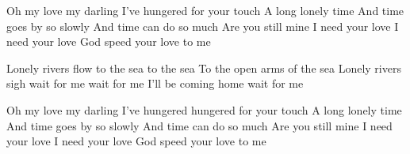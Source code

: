 \resetVars%
%
%
\MakeHeader%
\Lyrics%
Oh my love my darling
I've hungered for your touch
A long lonely time
And time goes by so slowly
And time can do so much
Are you still mine
I need your love
I need your love
God speed your love to me

Lonely rivers flow to the sea to the sea
To the open arms of the sea
Lonely rivers sigh wait for me wait for me
I'll be coming home wait for me

Oh my love my darling
I've hungered hungered for your touch
A long lonely time
And time goes by so slowly
And time can do so much
Are you still mine I need your love
I need your love
God speed your love to me
\Next
